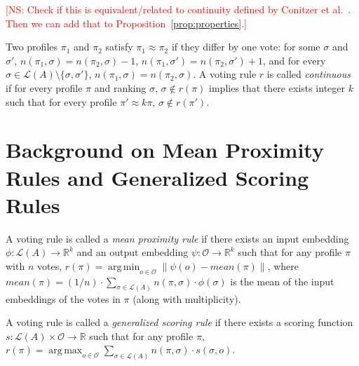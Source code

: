 \documentclass[10pt,letterpaper]{article}
\newcommand{\calL}{{\mathcal{L}}}
\newcommand{\rank}{{\calL(A)}}
\newcommand{\calO}{{\mathcal{O}}}
\DeclareMathOperator*{\argmax}{arg\,max}
\DeclareMathOperator*{\argmin}{arg\,min}
\newenvironment{definition}[1][Definition]{\begin{trivlist}
\item[\hskip \labelsep {\bfseries #1}]}{\end{trivlist}}
\newcommand{\kibitz}[2]{\ifnum\Comments=1\textcolor{#1}{#2}\fi}
\newcommand{\cns}[1]{\kibitz{red} {[NS: #1]}}
\begin{document}

\cns{Check if this is equivalent/related to continuity defined by Conitzer et al.~\cite{CRX09}. Then we can add that to Proposition~\ref{prop:properties}.}
\begin{definition}[Continuity]
Two profiles $\pi_1$ and $\pi_2$ satisfy $\pi_1 \approx \pi_2$ if they differ by one vote: for some $\sigma$ and $\sigma'$, $n(\pi_1,\sigma) = n(\pi_2,\sigma)-1$, $n(\pi_1,\sigma') = n(\pi_2,\sigma')+1$, and for every $\sigma \in \rank\setminus\{\sigma,\sigma'\}$, $n(\pi_1,\sigma) = n(\pi_2,\sigma)$. A voting rule $r$ is called \emph{continuous} if for every profile $\pi$ and ranking $\sigma$, $\sigma \notin r(\pi)$ implies that there exists integer $k$ such that for every profile $\pi' \approx k \pi$, $\sigma \notin r(\pi')$. 
\end{definition}


\section{Background on Mean Proximity Rules and Generalized Scoring Rules}


\begin{definition}[Mean Proximity Rules (Zwicker~\cite{Zwicker08a})]
A voting rule is called a \emph{mean proximity rule} if there exists an input embedding $\phi : \rank \rightarrow \mathbb{R}^k$ and an output embedding $\psi: \calO \rightarrow \mathbb{R}^k$ such that for any profile $\pi$ with $n$ votes, $r(\pi) = \argmin_{o \in \calO} \|\psi(o) - mean(\pi) \|$, where $mean(\pi) = (1/n) \cdot \sum_{\sigma \in \rank} n(\pi,\sigma) \cdot \phi(\sigma)$ is the mean of the input embeddings of the votes in $\pi$ (along with multiplicity). 
\end{definition}


\begin{definition}[Generalized Scoring Rules (Zwicker~\cite{Zwicker08a})]
A voting rule is called a \emph{generalized scoring rule} if there exists a scoring function $s : \rank \times \calO \rightarrow \mathbb{R}$ such that for any profile $\pi$, $r(\pi) = \argmax_{o \in \calO} \sum_{\sigma \in \rank} n(\pi,\sigma) \cdot s(\sigma,o)$. 
\end{definition}
\end{document}
